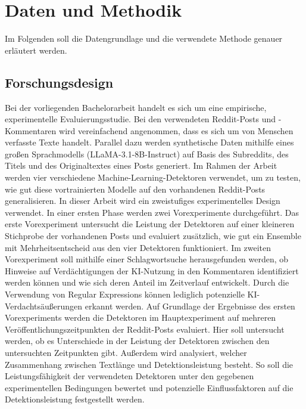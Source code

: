 \chapter{Daten und Methodik}
\label{chap:methodology}
Im Folgenden soll die Datengrundlage und die verwendete Methode genauer erläutert werden.

\section{Forschungsdesign}
\label{sec:forschungsdesign}
Bei der vorliegenden Bachelorarbeit handelt es sich um eine empirische, experimentelle Evaluierungsstudie. Bei den verwendeten Reddit-Posts und -Kommentaren wird vereinfachend angenommen, dass es sich um von Menschen verfasste Texte handelt. Parallel dazu werden synthetische Daten mithilfe eines großen Sprachmodells (LLaMA-3.1-8B-Instruct) auf Basis des Subreddits, des Titels und des Originaltextes eines Posts generiert. Im Rahmen der Arbeit werden vier verschiedene Machine-Learning-Detektoren verwendet, um zu testen, wie gut diese vortrainierten Modelle auf den vorhandenen Reddit-Posts generalisieren.
In dieser Arbeit wird ein zweistufiges experimentelles Design verwendet. In einer ersten Phase werden zwei Vorexperimente durchgeführt. Das erste Vorexperiment untersucht die Leistung der Detektoren auf einer kleineren Stichprobe der vorhandenen Posts und evaluiert zusätzlich, wie gut ein Ensemble mit Mehrheitsentscheid aus den vier Detektoren funktioniert. Im zweiten Vorexperiment soll mithilfe einer Schlagwortsuche herausgefunden werden, ob Hinweise auf Verdächtigungen der KI-Nutzung in den Kommentaren identifiziert werden können und wie sich deren Anteil im Zeitverlauf entwickelt. Durch die Verwendung von Regular Expressions können lediglich potenzielle KI-Verdachtsäußerungen erkannt werden. Auf Grundlage der Ergebnisse des ersten Vorexperiments werden die Detektoren im Hauptexperiment auf mehreren Veröffentlichungszeitpunkten der Reddit-Posts evaluiert. Hier soll untersucht werden, ob es Unterschiede in der Leistung der Detektoren zwischen den untersuchten Zeitpunkten gibt. Außerdem wird analysiert, welcher Zusammenhang zwischen Textlänge und Detektionsleistung besteht. So soll die Leistungsfähigkeit der verwendeten Detektoren unter den gegebenen experimentellen Bedingungen bewertet und potenzielle Einflussfaktoren auf die Detektionsleistung festgestellt werden.

